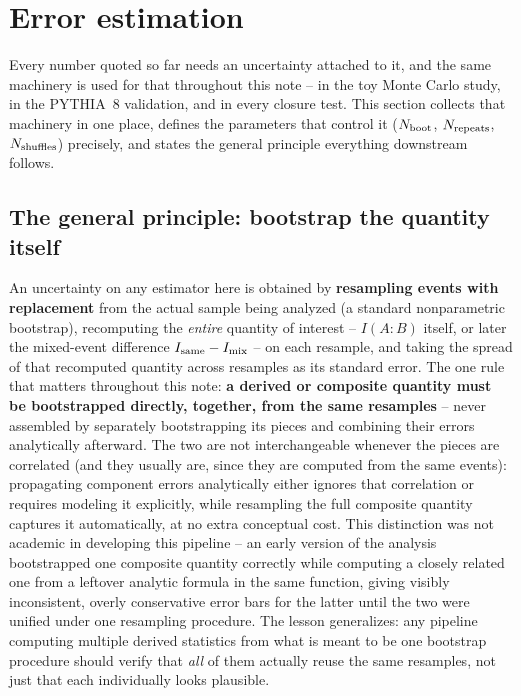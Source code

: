 \documentclass[11pt]{article}
\begin{document}
\section{Error estimation}
\label{sec:errors}

Every number quoted so far needs an uncertainty attached to it, and the
same machinery is used for that throughout this note -- in the toy Monte
Carlo study, in the PYTHIA~8 validation, and in every closure test. This
section collects that machinery in one place, defines the parameters
that control it ($N_{\rm boot}$, $N_{\rm repeats}$, $N_{\rm shuffles}$)
precisely, and states the general principle everything downstream
follows.

\subsection{The general principle: bootstrap the quantity itself}
\label{sec:errors-principle}

An uncertainty on any estimator here is obtained by \textbf{resampling
events with replacement} from the actual sample being analyzed (a
standard nonparametric bootstrap), recomputing the \emph{entire}
quantity of interest -- $I(A{:}B)$ itself, or later the mixed-event
difference $I_{\rm same}-I_{\rm mix}$ -- on each resample, and taking the
spread of that recomputed quantity across resamples as its standard
error. The one rule that matters throughout this note: \textbf{a derived
or composite quantity must be bootstrapped directly, together, from the
same resamples} -- never assembled by separately bootstrapping its
pieces and combining their errors analytically afterward. The two are
not interchangeable whenever the pieces are correlated (and they usually
are, since they are computed from the same events): propagating
component errors analytically either ignores that correlation or
requires modeling it explicitly, while resampling the full composite
quantity captures it automatically, at no extra conceptual cost. This
distinction was not academic in developing this pipeline -- an early
version of the analysis bootstrapped one composite quantity correctly
while computing a closely related one from a leftover analytic formula
in the same function, giving visibly inconsistent, overly conservative
error bars for the latter until the two were unified under one
resampling procedure. The lesson generalizes: any pipeline computing
multiple derived statistics from what is meant to be one bootstrap
procedure should verify that \emph{all} of them actually reuse the same
resamples, not just that each individually looks plausible.
\end{document}
